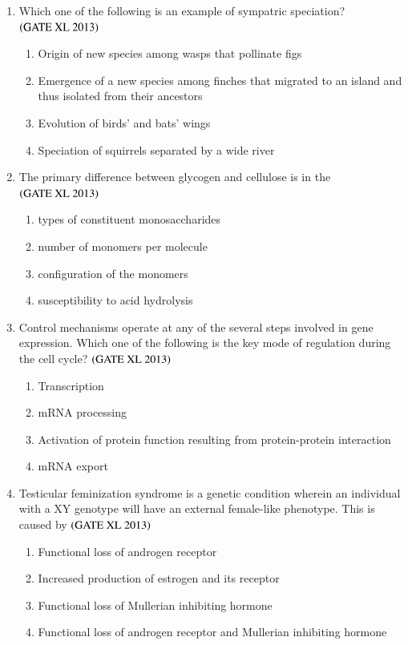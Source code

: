 \documentclass[journal]{IEEEtran}
\begin{document}
\begin{enumerate}
\item Which one of the following is an example of sympatric speciation? \hfill $\left(\text{GATE XL 2013}\right)$
\begin{enumerate}
    \item Origin of new species among wasps that pollinate figs
    \item Emergence of a new species among finches that migrated to an island and thus isolated from their ancestors
    \item Evolution of birds' and bats' wings
    \item Speciation of squirrels separated by a wide river
\end{enumerate}

\item The primary difference between glycogen and cellulose is in the \hfill $\left(\text{GATE XL 2013}\right)$
\begin{enumerate}
    \item types of constituent monosaccharides
    \item number of monomers per molecule
    \item configuration of the monomers
    \item susceptibility to acid hydrolysis
\end{enumerate}

\item Control mechanisms operate at any of the several steps involved in gene expression. Which one of the following is the key mode of regulation during the cell cycle? \hfill $\left(\text{GATE XL 2013}\right)$
\begin{enumerate}
    \item Transcription
    \item mRNA processing
    \item Activation of protein function resulting from protein-protein interaction
    \item mRNA export
\end{enumerate}

\item Testicular feminization syndrome is a genetic condition wherein an individual with a XY genotype will have an external female-like phenotype. This is caused by \hfill $\left(\text{GATE XL 2013}\right)$
\begin{enumerate}
    \item Functional loss of androgen receptor
    \item Increased production of estrogen and its receptor
    \item Functional loss of Mullerian inhibiting hormone
    \item Functional loss of androgen receptor and Mullerian inhibiting hormone
\end{enumerate}


\end{enumerate}
\end{document}
